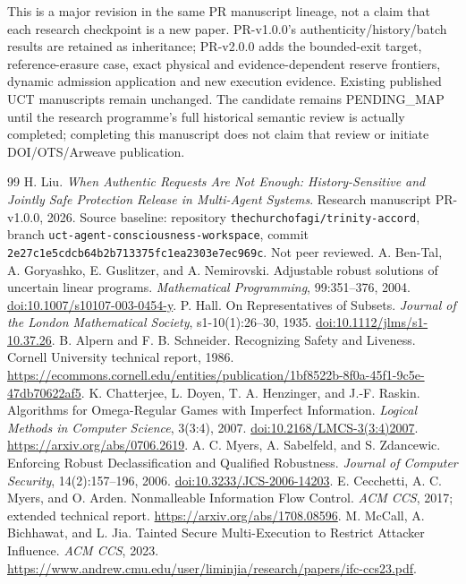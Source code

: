 This is a major revision in the same PR manuscript lineage, not a claim that each research checkpoint is a new paper. PR-v1.0.0's authenticity/history/batch results are retained as inheritance; PR-v2.0.0 adds the bounded-exit target, reference-erasure case, exact physical and evidence-dependent reserve frontiers, dynamic admission application and new execution evidence. Existing published UCT manuscripts remain unchanged. The candidate remains PENDING\_MAP until the research programme's full historical semantic review is actually completed; completing this manuscript does not claim that review or initiate DOI/OTS/Arweave publication.

\begin{thebibliography}{99}\small
{} H. Liu. \emph{When Authentic Requests Are Not Enough: History-Sensitive and Jointly Safe Protection Release in Multi-Agent Systems}. Research manuscript PR-v1.0.0, 2026. Source baseline: repository \texttt{thechurchofagi/trinity-accord}, branch \texttt{uct-agent-consciousness-workspace}, commit \texttt{2e27c1e5cdcb64b2b713375fc1ea2303e7ec969c}. Not peer reviewed.
 A. Ben-Tal, A. Goryashko, E. Guslitzer, and A. Nemirovski. Adjustable robust solutions of uncertain linear programs. \emph{Mathematical Programming}, 99:351--376, 2004. \href{https://doi.org/10.1007/s10107-003-0454-y}{doi:10.1007/s10107-003-0454-y}.
 P. Hall. On Representatives of Subsets. \emph{Journal of the London Mathematical Society}, s1-10(1):26--30, 1935. \href{https://doi.org/10.1112/jlms/s1-10.37.26}{doi:10.1112/jlms/s1-10.37.26}.
 B. Alpern and F. B. Schneider. Recognizing Safety and Liveness. Cornell University technical report, 1986. \url{https://ecommons.cornell.edu/entities/publication/1bf8522b-8f0a-45f1-9c5e-47db70622af5}.
 K. Chatterjee, L. Doyen, T. A. Henzinger, and J.-F. Raskin. Algorithms for Omega-Regular Games with Imperfect Information. \emph{Logical Methods in Computer Science}, 3(3:4), 2007. \href{https://doi.org/10.2168/LMCS-3(3:4)2007}{doi:10.2168/LMCS-3(3:4)2007}. \url{https://arxiv.org/abs/0706.2619}.
 A. C. Myers, A. Sabelfeld, and S. Zdancewic. Enforcing Robust Declassification and Qualified Robustness. \emph{Journal of Computer Security}, 14(2):157--196, 2006. \href{https://doi.org/10.3233/JCS-2006-14203}{doi:10.3233/JCS-2006-14203}.
 E. Cecchetti, A. C. Myers, and O. Arden. Nonmalleable Information Flow Control. \emph{ACM CCS}, 2017; extended technical report. \url{https://arxiv.org/abs/1708.08596}.
 M. McCall, A. Bichhawat, and L. Jia. Tainted Secure Multi-Execution to Restrict Attacker Influence. \emph{ACM CCS}, 2023. \url{https://www.andrew.cmu.edu/user/liminjia/research/papers/ifc-ccs23.pdf}.

\end{thebibliography}
